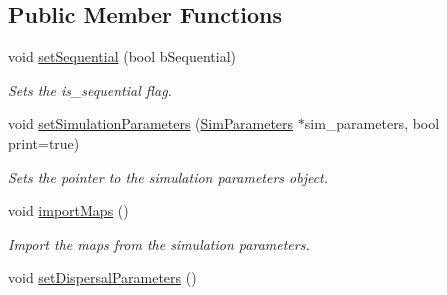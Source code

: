 \subsection*{Public Member Functions}
\begin{DoxyCompactItemize}
\item 
void \hyperlink{class_simulate_dispersal_a3da09319132db8c7ad035290be6590ef}{set\+Sequential} (bool b\+Sequential)
\begin{DoxyCompactList}\small\item\em Sets the is\+\_\+sequential flag. \end{DoxyCompactList}\item 
void \hyperlink{class_simulate_dispersal_a9d08a14b3f2a78591af2edf2884edb52}{set\+Simulation\+Parameters} (\hyperlink{struct_sim_parameters}{Sim\+Parameters} $\ast$sim\+\_\+parameters, bool print=true)
\begin{DoxyCompactList}\small\item\em Sets the pointer to the simulation parameters object. \end{DoxyCompactList}\item 
void \hyperlink{class_simulate_dispersal_a275eef6872de493273fc047467935d7b}{import\+Maps} ()\hypertarget{class_simulate_dispersal_a275eef6872de493273fc047467935d7b}{}\label{class_simulate_dispersal_a275eef6872de493273fc047467935d7b}

\begin{DoxyCompactList}\small\item\em Import the maps from the simulation parameters. \end{DoxyCompactList}\item 
void \hyperlink{class_simulate_dispersal_a4acdae18451d1e9f67c005390b89664f}{set\+Dispersal\+Parameters} ()\hypertarget{class_simulate_dispersal_a4acdae18451d1e9f67c005390b89664f}{}\label{class_simulate_dispersal_a4acdae18451d1e9f67c005390b89664f}


\end{DoxyCompactItemize}

